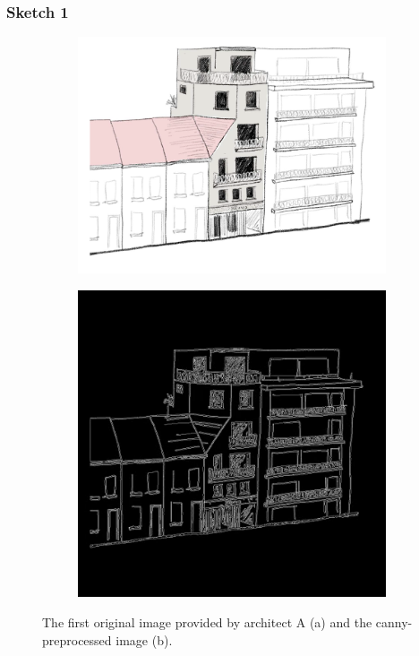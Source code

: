 \subsubsection{Sketch 1}
\begin{figure}[H]
    \centering
    \begin{subfigure}[b]{0.3\textwidth}
        \centering
        \includegraphics[width=\textwidth]{Images/Results/Architect-A_unstructured-phase/sketches/sketch_1.png}
        \caption{}
        \label{A-unstructured-1-sketch}
    \end{subfigure}
    \begin{subfigure}[b]{0.3\textwidth}
        \centering 
        \includegraphics[width=\textwidth]{Images/Results/Architect-A_unstructured-phase/sketches/sketch_1_preprocessed.png}
        \caption{}
        \label{A-unstructured-1-sketch-prep}
    \end{subfigure}
    \caption{The first original image provided by architect A (a) and the canny-preprocessed image (b).}
    \label{fig:placeholder}
\end{figure}
